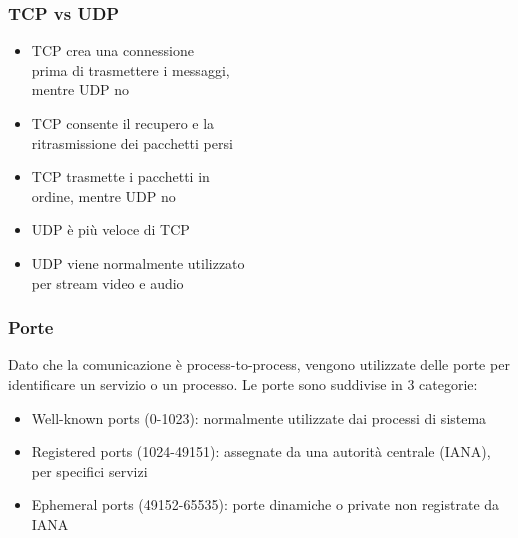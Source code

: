 \documentclass[aspectratio=169]{beamer}
\begin{document}
    \begin{frame}
        \frametitle{TCP vs UDP}
        \begin{itemize}
            \item  TCP crea una connessione\\prima di trasmettere i messaggi,\\mentre UDP no
            \item TCP consente il recupero e la\\ritrasmissione dei pacchetti persi
            \item TCP trasmette i pacchetti in\\ordine, mentre UDP no
            \item UDP è più veloce di TCP
            \item UDP viene normalmente utilizzato\\per stream video e audio
        \end{itemize}
    \end{frame}
    
    \begin{frame}
        \frametitle{Porte}
        Dato che la comunicazione è process-to-process, vengono utilizzate delle porte per identificare un servizio o un processo.
        \vskip 0.3cm
        Le porte sono suddivise in 3 categorie:
        \begin{itemize}
            \item Well-known ports (0-1023): normalmente utilizzate dai processi di sistema
            \item Registered ports (1024-49151): assegnate da una autorità centrale (IANA), per specifici servizi
            \item Ephemeral ports (49152-65535): porte dinamiche o private non registrate da IANA
        \end{itemize}
    \end{frame}
    
\end{document}
